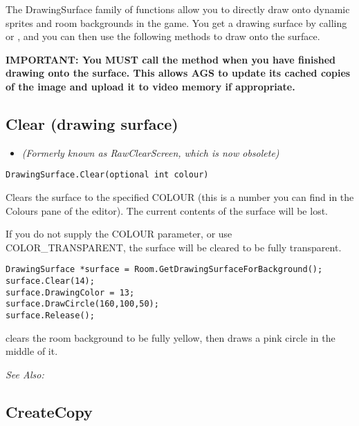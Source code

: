 The DrawingSurface family of functions allow you to directly draw onto dynamic sprites
and room backgrounds in the game. You get a drawing surface by calling
 or
,
and you can then use the following methods to draw onto the surface.

\bf{IMPORTANT:} You \bf{MUST} call the  method
when you have finished drawing onto the surface. This allows AGS to update its cached
copies of the image and upload it to video memory if appropriate.


\subsection{Clear (drawing surface)}\label{DrawingSurface.Clear}%

\begin{itemize}
\item \it{(Formerly known as RawClearScreen, which is now obsolete)}
\end{itemize}

\begin{verbatim}
DrawingSurface.Clear(optional int colour)
\end{verbatim}
Clears the surface to the specified COLOUR (this is a number you can find in
the Colours pane of the editor). The current contents of the surface will be lost.

If you do not supply the COLOUR parameter, or use COLOR_TRANSPARENT, the surface
will be cleared to be fully transparent.

\begin{verbatim}
DrawingSurface *surface = Room.GetDrawingSurfaceForBackground();
surface.Clear(14);
surface.DrawingColor = 13;
surface.DrawCircle(160,100,50);
surface.Release();
\end{verbatim}
clears the room background to be fully yellow, then draws a pink circle in the middle of it.

\it{See Also:} 


\subsection{CreateCopy}\label{DrawingSurface.CreateCopy}%

